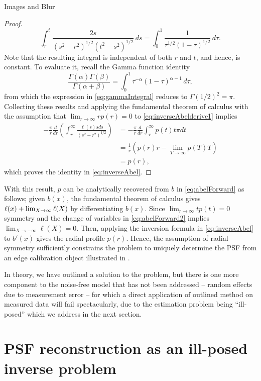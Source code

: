 \begin{chapter}{Images and Blur}
\begin{proof}
\begin{equation}
    \int_r^t \frac{2s}{(s^2 - r^2)^{1/2}(t^2 - s^2)^{1/2}}\,ds
    = \int_0^1 \frac {1}{\tau^{1/2}(1-\tau)^{1/2}}\,d\tau. \label{eq:gammaIntegral}
  \end{equation}
  Note that the resulting integral is independent of both $r$ and $t$, and hence, is constant. To evaluate it, recall the Gamma function identity
  \begin{equation} 
    \frac{\Gamma(\alpha)\Gamma(\beta)}{\Gamma(\alpha + \beta)} = \int_0^1 \tau^{-\alpha}(1-\tau)^{\alpha -1}\,d\tau,
  \end{equation}
  from which the expression in \eqref{eq:gammaIntegral} reduces to $\Gamma(1/2)^2 = \pi$.
  Collecting these results and applying the fundamental theorem of calculus with the assumption that $\lim_{r\to\infty}rp(r) = 0$ to \eqref{eq:inverseAbelderive1} implies
  \begin{align}
    -\frac{\pi}{r} \frac{d}{dr} \left(\int_r^\infty \frac{\ell(s) s ds}{ (s^2 - r^2)^{1/2} } \right) 
      &= -\frac{\pi}{r} \frac{d}{dr} \int_r^\infty p(t) t \pi dt \nonumber\\
      &= \frac{1}{r} \left(p(r)r - \lim_{T\to\infty}p(T)T\right) \nonumber\\
      &= p(r),
  \end{align}
  which proves the identity in \eqref{eq:inverseAbel}.
\end{proof}
  
  With this result, $p$ can be analytically recovered from $b$ in \eqref{eq:abelForward} as follows; given $b(x)$, the fundamental theorem of calculus gives $\ell(x) + \lim_{X\to\-\infty}\ell(X)$ by differentiating $b(x)$.
  Since $\lim_{r\to\infty}tp(t) = 0$ symmetry and the change of variables in \eqref{eq:abelForward2} implies $\lim_{X\to-\infty}\ell(X) = 0$. 
  Then, applying the inversion formula in \eqref{eq:inverseAbel} to $b'(x)$ gives the radial profile $p(r)$.
  Hence, the assumption of radial symmetry sufficiently constrains the problem to uniquely determine the PSF from an edge calibration object illustrated in .

  In theory, we have outlined a solution to the problem, but there is one more component to the noise-free model that has not been addressed -- random effects due to measurement error -- for which a direct application of outlined method on measured data will fail spectacularly, due to the estimation problem being ``ill-posed'' which we address in the next section.

\section{PSF reconstruction as an ill-posed inverse problem}
  

\end{chapter}
